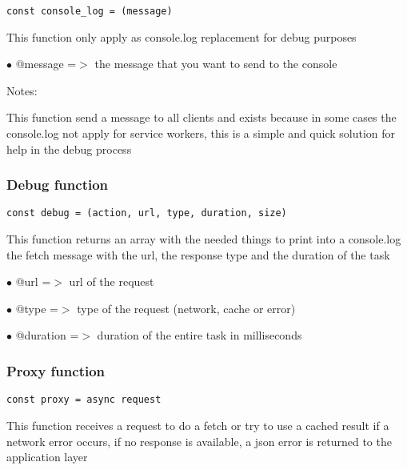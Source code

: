 \documentclass[a4paper]{article}
\begin{document}
\begin{lstlisting}
const console_log = (message)
\end{lstlisting}

This function only apply as console.log replacement for debug purposes

\begin{compactitem}
\item[\color{myblue}$\bullet$] @message =$>$ the message that you want to send to the console
\end{compactitem}

Notes:

This function send a message to all clients and exists because in some cases
the console.log not apply for service workers, this is a simple and quick
solution for help in the debug process

\hypertarget{toc821}{}
\subsubsection{Debug function}

\begin{lstlisting}
const debug = (action, url, type, duration, size)
\end{lstlisting}

This function returns an array with the needed things to print into a console.log
the fetch message with the url, the response type and the duration of the task

\begin{compactitem}
\item[\color{myblue}$\bullet$] @url      =$>$ url of the request
\item[\color{myblue}$\bullet$] @type     =$>$ type of the request (network, cache or error)
\item[\color{myblue}$\bullet$] @duration =$>$ duration of the entire task in milliseconds
\end{compactitem}

\hypertarget{toc822}{}
\subsubsection{Proxy function}

\begin{lstlisting}
const proxy = async request
\end{lstlisting}

This function receives a request to do a fetch or try to use a cached result
if a network error occurs, if no response is available, a json error is returned
to the application layer
\end{document}
